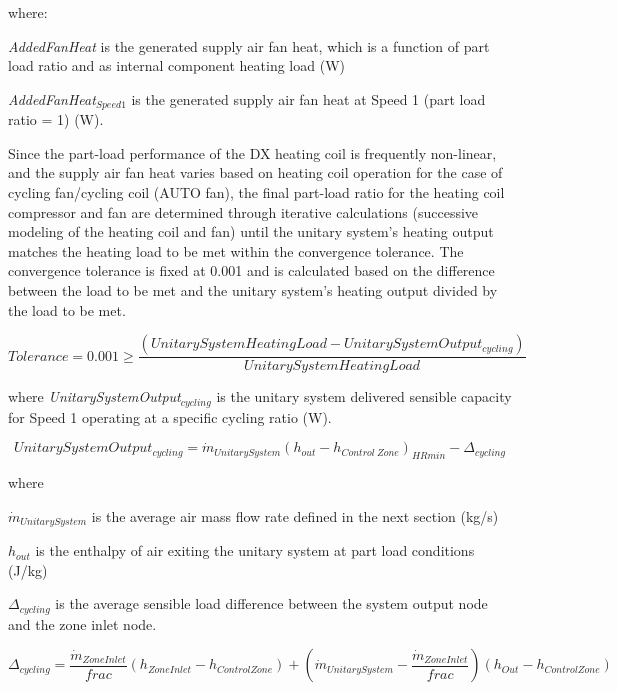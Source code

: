 where:

\emph{AddedFanHeat} is the generated supply air fan heat, which is a function of part load ratio and as internal component heating load (W)

\emph{AddedFanHeat\(_{Speed1}\)} is the generated supply air fan heat at Speed 1 (part load ratio = 1) (W).

Since the part-load performance of the DX heating coil is frequently non-linear, and the supply air fan heat varies based on heating coil operation for the case of cycling fan/cycling coil (AUTO fan), the final part-load ratio for the heating coil compressor and fan are determined through iterative calculations (successive modeling of the heating coil and fan) until the unitary system's heating output matches the heating load to be met within the convergence tolerance. The convergence tolerance is fixed at 0.001 and is calculated based on the difference between the load to be met and the unitary system's heating output divided by the load to be met.

\begin{equation}
Tolerance = 0.001 \ge \frac{{\left( {UnitarySystemHeatingLoad - UnitarySystemOutpu{t_{cycling}}} \right)}}{{UnitarySystemHeatingLoad}}
\end{equation}

where \emph{UnitarySystemOutput\(_{cycling}\)} is the unitary system delivered sensible capacity for Speed 1 operating at a specific cycling ratio (W).

\begin{equation}
UnitarySystemOutput_{cycling} = \dot{m}_{UnitarySystem} \left( h_{out} - h_{Control~Zone} \right)_{HRmin} - \Delta_{cycling}
\end{equation}

where

\(\dot{m}_{UnitarySystem}\) is the average air mass flow rate defined in the next section (kg/s)

\(h_{out}\) is the enthalpy of air exiting the unitary system at part load conditions (J/kg)

\(\Delta_{cycling}\) is the average sensible load difference between the system output node and the zone inlet node.

\begin{equation}
\Delta_{cycling} = \frac{\dot{m}_{ZoneInlet}}{frac} \left( h_{ZoneInlet} - h_{ControlZone} \right) + \left( \dot{m}_{UnitarySystem} - \frac{\dot{m}_{ZoneInlet}}{frac} \right) \left( h_{Out} - h_{ControlZone} \right)
\end{equation}

